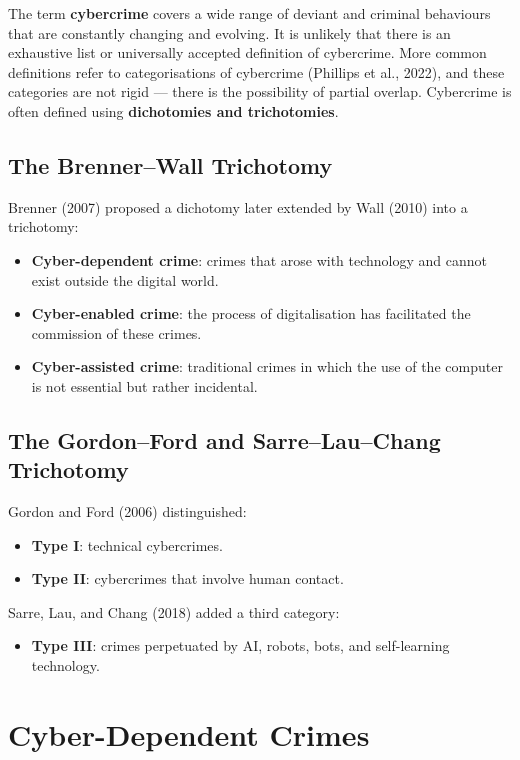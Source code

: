 \documentclass[11pt,a4paper,openany]{report}
\theoremstyle{definition}
\theoremstyle{plain}
\theoremstyle{remark}
\begin{document}
The term \textbf{cybercrime} covers a wide range of deviant and criminal behaviours that are constantly changing and evolving. It is unlikely that there is an exhaustive list or universally accepted definition of cybercrime. More common definitions refer to categorisations of cybercrime (Phillips et al., 2022), and these categories are not rigid --- there is the possibility of partial overlap. Cybercrime is often defined using \textbf{dichotomies and trichotomies}.

\subsection{The Brenner--Wall Trichotomy}

Brenner (2007) proposed a dichotomy later extended by Wall (2010) into a trichotomy:

\begin{itemize}
    \item \textbf{Cyber-dependent crime}: crimes that arose with technology and cannot exist outside the digital world.
    \item \textbf{Cyber-enabled crime}: the process of digitalisation has facilitated the commission of these crimes.
    \item \textbf{Cyber-assisted crime}: traditional crimes in which the use of the computer is not essential but rather incidental.
\end{itemize}

\subsection{The Gordon--Ford and Sarre--Lau--Chang Trichotomy}

Gordon and Ford (2006) distinguished:

\begin{itemize}
    \item \textbf{Type I}: technical cybercrimes.
    \item \textbf{Type II}: cybercrimes that involve human contact.
\end{itemize}

Sarre, Lau, and Chang (2018) added a third category:

\begin{itemize}
    \item \textbf{Type III}: crimes perpetuated by AI, robots, bots, and self-learning technology.
\end{itemize}


\section{Cyber-Dependent Crimes}
\end{document}
